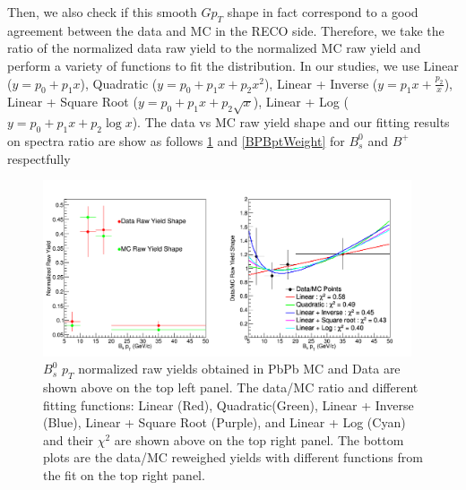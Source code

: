 Then, we also check if this smooth $Gp_T$ shape in fact correspond to a good agreement between the data and MC in the RECO side. Therefore, we take the ratio of the normalized data raw yield to the normalized MC raw yield and perform a variety of functions to fit the distribution. In our studies, we use Linear ($y = p_0 + p_1 x$), Quadratic ($y = p_0 + p_1 x + p_2 x^2$), Linear + Inverse  ($y = p_1 x + \frac{p_2}{x}$), Linear + Square Root ($y = p_0 + p_1 x + p_2 \sqrt{x}$), Linear + Log ($y = p_0 + p_1 x + p_2 \log{x}$). The data vs MC raw yield shape and our fitting results on spectra ratio are show as follows \ref{BsBptWeight} and  \ref{BPBptWeight} for $B^0_s$ and $B^+$ respectfully 



\begin{figure}[h]
\begin{center}
\includegraphics[width= 0.97\textwidth]{Figures/Chapter5/BsBptDataMC.png}
\caption{ $B^0_s$ $p_T$ normalized raw yields obtained in PbPb MC and Data are shown above on the top left panel. The data/MC ratio and different fitting functions: Linear (Red), Quadratic(Green), Linear + Inverse (Blue), Linear + Square Root (Purple), and Linear + Log (Cyan) and their $\chi^2$ are shown above on the top right panel. The bottom plots are the data/MC reweighed yields with different functions from the fit on the top right panel.}
\label{BsBptWeight}
\end{center}
\end{figure}

